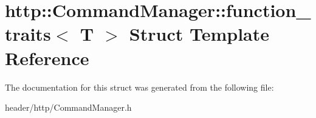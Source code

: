 \hypertarget{structhttp_1_1_command_manager_1_1function__traits}{}\section{http\+:\+:Command\+Manager\+:\+:function\+\_\+traits$<$ T $>$ Struct Template Reference}
\label{structhttp_1_1_command_manager_1_1function__traits}


The documentation for this struct was generated from the following file\+:\begin{DoxyCompactItemize}
\item 
header/http/Command\+Manager.\+h\end{DoxyCompactItemize}
